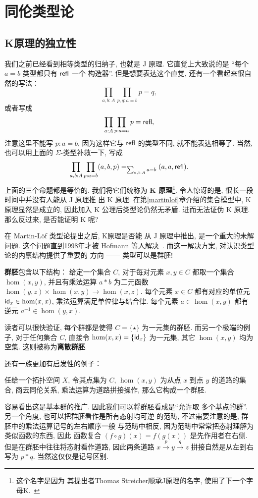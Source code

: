 \chapter{同伦类型论}
\section{K原理的独立性}\label{hott:independent}
我们之前已经看到相等类型的归纳子, 也就是 J 原理. 它直觉上大致说的是
“每个 \(a = b\) 类型都只有 \(\textnormal{\textsf{refl}}\) 一个
构造器”. 但是想要表达这个直觉, 还有一个看起来很自然的写法：
\[\prod_{a,b : A} \prod_{p,q : a = b} p = q,\]
或者写成
\[\prod_{a : A} \prod_{p : a = a} p = \textnormal{\textsf{refl}},\]
注意这里不能写 \(p : a = b\), 因为这样它与
\(\textnormal{\textsf{refl}}\) 的类型不同, 就不能表达相等了.
当然, 也可以用上面的 \(\Sigma\)-类型补救一下, 写成
\[\prod_{a,b : A} \prod_{p: a = b} (a,b,p) =_{\sum_{a,b : A}a = b} (a,a,\textnormal{\textsf{refl}}).\]
上面的三个命题都是等价的. 我们将它们统称为
\textbf{K 原理}\footnote{这个名字是因为
其提出者Thomas Streicher顺承J原理的名字, 使用了下一个字母K.~\cite{streicher:1993:K}}.
令人惊讶的是, 很长一段时间中并没有人能从 J 原理推
出 K 原理. 在第\ref{martinlof}章介绍的集合模型中,
K 原理显然是成立的, 因此加入 K 公理后类型论仍然无矛盾.
进而无法证伪 K 原理. 那么反过来, 是否能证明 K 呢?

在 Martin-L\"of 类型论提出之后, K原理是否能
从 J 原理中推出, 是一个重大的未解问题.
这个问题直到1998年才被 Hofmann 等人解决~\cite{hofmann:1998:groupoid}.
而这一解决方案, 对认识类型论的内禀结构提供了重要的
方向 ------ 类型可以是群胚!

\begin{definition}
\textbf{群胚}包含以下结构：
给定一个集合 \(C\), 对于每对元素 \(x,y\in C\)
都取一个集合 \(\hom(x,y)\), 并且有乘法运算
\(a * b\) 为二元函数 \(\hom(y,z) \times \hom(x,y) \to \hom(x,z)\).
每个元素 \(x \in C\) 都有对应的单位元
\(\textnormal{\textsf{id}}_x \in \hom(x,x)\), 乘法运算满足单位律与结合律.
每个元素 \(a \in \hom(x,y)\) 都有逆元
\(a^{-1} \in \hom(y,x)\).
\end{definition}
读者可以很快验证, 每个群都是使得 \(C = \{\star\}\)
为一元集的群胚. 而另一个极端的例子, 对于任何集合 \(C\),
直接令 \(\hom(x,x) = \{\textnormal{\textsf{id}}_x\}\) 为一元集, 其它 \(\hom(x,y)\)
均为空集. 这则被称为\textbf{离散群胚}.

还有一族更加有启发性的例子：
\begin{example}
任给一个拓扑空间 \(X\), 令其点集为
\(C\), \(\hom(x,y)\) 为从点 \(x\) 到点
\(y\) 的道路的集合, 商去同伦关系,
乘法运算为道路拼接操作, 那么它构成一个群胚.
\end{example}
容易看出这是基本群的推广. 因此我们可以将群胚看成是“允许取
多个基点的群”. 另一个角度, 也可以把群胚看作是所有态射均可逆
的范畴, 不过需要注意的是, 群胚中的乘法运算记号的左右顺序一般
与范畴中相反, 因为范畴中常常把态射理解为类似函数的东西, 因此
函数复合 \((f \circ g)(x) = f(g(x))\) 是先作用者在右侧.
但是在群胚中往往将态射看作道路, 因此两条道路
\(x \xrightarrow p y \xrightarrow q z\)
拼接自然是从左到右写为 \(p * q\). 当然这仅仅是记号区别.

